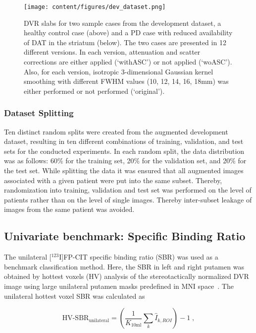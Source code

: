 \begin{figure}[t]
    \centering
    \texttt{[image: content/figures/dev\_dataset.png]}
    \caption{DVR slabs for two sample cases from the development dataset, 
    a healthy control case (above) and a PD case with reduced availability of DAT in the striatum (below).
    The two cases are presented in 12 different versions.
    In each version, attenuation and scatter corrections are either applied (`withASC') or not applied (`woASC').
    Also, for each version, isotropic 3-dimensional Gaussian kernel smoothing with different FWHM values (10, 12, 14, 16, 18mm) was 
    either performed or not performed (`original').} 
    \label{fig:dev_dataset}
\end{figure}

\subsubsection{Dataset Splitting}
\label{subsec:split}

Ten distinct random splits were created from the augmented development dataset, 
resulting in ten different combinations of training, validation, and test sets for the conducted experiments.
In each random split, the data distribution was as follows: 
60\% for the training set, 20\% for the validation set, and 20\% for the test set.
While splitting the data it was ensured that all augmented images associated with a given patient were put 
into the same subset.
Thereby, randomization into training, validation and test set was performed 
on the level of patients rather than on the level of single images.
Thereby inter-subset leakage of images from the same patient was avoided.

\subsection{Univariate benchmark: Specific Binding Ratio}
\label{subsec:sbr}

The unilateral [$^{123}$I]FP-CIT specific binding ratio (SBR) was used as a benchmark classification method.
Here, the SBR in left and right putamen was obtained by hottest voxels (HV) analysis of the stereotactically normalized 
DVR image using large unilateral putamen masks predefined in MNI space~\citep{Wenzel2019}.
The unilateral hottest voxel SBR was calculated as

\begin{equation}\label{eq:sbr}
  \text{HV-SBR}_{\text{unilateral}} = \left( \frac{1}{K_{\text{10ml}}} \sum_{k} \hat{I}_{k, ROI} \right) - 1 \;,
\end{equation}

